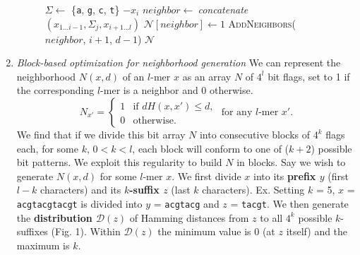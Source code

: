 \documentclass[conference]{IEEEtran}
\begin{document}
\begin{enumerate}[label={\em \arabic*.}]
\begin{figure}[b]
\begin{algorithmic}[1]
						\State $\Sigma \leftarrow$ \{\texttt{a}, \texttt{g}, \texttt{c}, \texttt{t}\} $- x_{i}$ \hspace*{6pt}
							\State $neighbor \leftarrow\ ${\em\small concatenate}$(x_{1...i-1},\Sigma_{j},x_{i+1...l})$
							\State $\mathcal{N}[neighbor] \leftarrow 1$
								\State \textsc{AddNeighbors}($neighbor$, $i+1$, $d-1$)
							\EndIf
						\EndFor
					\EndFor
				\EndProcedure
				\State\Return $\mathcal{N}$
				\end{algorithmic}
			\end{figure}
		\newpage
		\item{\em Block-based optimization for neighborhood generation}\newline
			We can represent the neighborhood $N(x,d)$ of an $l$-mer $x$ as an array $N$ of $4^{l}$ bit flags, set to 1 if the corresponding $l$-mer is a neighbor and 0 otherwise.
			\begin{equation*}
				N_{x'} = \left\{
				\begin{array}{rl}
					1 & \text{if } dH(x,x') \leq d,\\
					0 & \text{otherwise.}%
				\end{array} \right.
				\text{ for any $l$-mer }x'.
				\end{equation*}
			We find that if we divide this bit array $N$ into consecutive blocks of $4^{k}$ flags each, for some $k$, $0 < k < l$, each block will conform to one of ($k + 2$) possible bit patterns. We exploit this regularity to build $N$ in blocks.\newline\newline
			Say we wish to generate $N(x,d)$ for some $l$-mer $x$. We first divide $x$ into its {\boldmath\bf prefix $y$} (first $l-k$ characters) and its {\boldmath\bf $k$-suffix $z$} (last $k$ characters).\newline\newline	
				{\small 
					Ex. Setting $k$ = 5, $x$ = \texttt{acgtacgtacgt}\newline
					\hspace*{18pt}is divided into $y$ = \texttt{acgtacg} and $z$ = \texttt{tacgt}.}\newline\newline
			We then generate the {\boldmath\bf distribution $\mathcal{D}(z)$} of Hamming distances from $z$ to all $4^{k}$ possible $k$-suffixes (Fig. 1). Within $\mathcal{D}(z)$ the minimum value is 0 (at $z$ itself) and the maximum is $k$.%

\end{enumerate}
\end{document}
